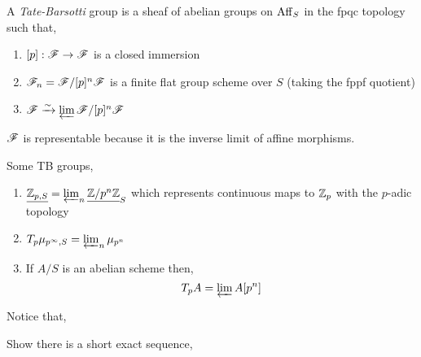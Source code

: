 \documentclass[12pt]{article}
\begin{document}
\begin{defn}
A \textit{Tate-Barsotti} group is a sheaf of abelian groups on $\mathrm{Aff}_S$ in the fpqc topology such that,
\begin{enumerate}
\item $[p] : \mathscr{F} \to \mathscr{F}$ is a closed immersion
\item $\mathscr{F}_n = \mathscr{F} / [p]^n \mathscr{F}$ is a finite flat group scheme over $S$ (taking the fppf quotient)
\item $\mathscr{F} \xrightarrow{\sim} \varprojlim \mathscr{F} / [p]^n \mathscr{F}$
\end{enumerate}
\end{defn}

\begin{prop}
$\mathscr{F}$ is representable because it is the inverse limit of affine morphisms.
\end{prop}

\begin{example}
Some TB groups,
\begin{enumerate}
\item $\underline{\mathbb{Z}_{p,S}} = \varprojlim_n \underline{\mathbb{Z} / p^n \mathbb{Z}}_S$ which represents continuous maps to $\mathbb{Z}_p$ with the $p$-adic topology

\item $T_p \mu_{p^\infty, S} = \varprojlim_n \mu_{p^n}$

\item If $A/S$ is an abelian scheme then,
\[ T_p A = \varprojlim A[p^n] \]
\end{enumerate}
\end{example}

\begin{rmk}
Notice that,
\begin{center}
\end{center}
\end{rmk}

\begin{prop}
Show there is a short exact sequence,
\begin{center}
\end{center}
\end{prop}
\end{document}
